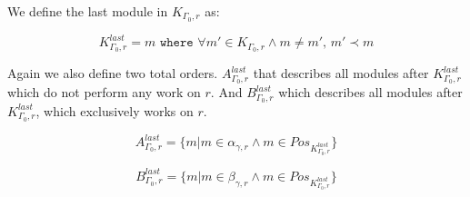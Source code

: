 We define the last module in $K_{\Gamma_0 ,r}$ as:

\[K_{\Gamma_0 ,r}^{last} = m \texttt{ where } \forall m' \in K_{\Gamma_0 ,r} \land m \neq m',\, m' \prec m \] 


Again we also define two total orders. $A_{\Gamma_0 ,r}^{last}$ that describes all modules after $K_{\Gamma_0 ,r}^{last}$ which do not perform any work on $r$. And $B_{\Gamma_0 ,r}^{last}$ which describes all modules after $K_{\Gamma_0 ,r}^{last}$, which exclusively works on $r$.


\[ A_{\Gamma_0 ,r}^{last} = \{m | m \in \alpha_{\gamma ,r}  \land m \in Pos_{K_{\Gamma_0 ,r}^{last}} \} \]

\[B_{\Gamma_0 ,r}^{last} = \{m | m \in \beta_{\gamma ,r}  \land m \in Pos_{K_{\Gamma_0 ,r}^{last}} \}\]

